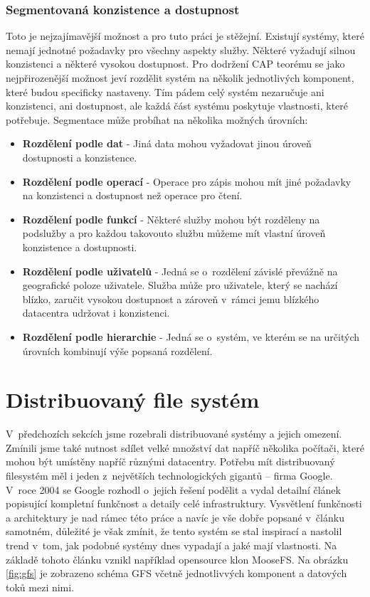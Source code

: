 \subsubsection{Segmentovaná konzistence a dostupnost}
Toto je nejzajímavější možnost a pro tuto práci je stěžejní. Existují systémy, které nemají jednotné požadavky pro všechny aspekty služby. Některé vyžadují silnou konzistenci a některé vysokou dostupnost. Pro dodržení CAP teorému se jako nejpřirozenější možnost jeví rozdělit systém na několik jednotlivých komponent, které budou specificky nastaveny. Tím pádem celý systém nezaručuje ani konzistenci, ani dostupnost, ale každá část systému poskytuje vlastnosti, které potřebuje. Segmentace může probíhat na několika možných úrovních: 

\begin{itemize}
\item \textbf{Rozdělení podle dat} - Jiná data mohou vyžadovat jinou úroveň dostupnosti a konzistence.
\item \textbf{Rozdělení podle operací} - Operace pro zápis mohou mít jiné požadavky na konzistenci a dostupnost než operace pro čtení.
\item \textbf{Rozdělení podle funkcí} - Některé služby mohou být rozděleny na podslužby a pro každou takovouto službu můžeme mít vlastní úroveň konzistence a dostupnosti. 
\item \textbf{Rozdělení podle uživatelů} - Jedná se o~rozdělení závislé převážně na geografické poloze uživatele. Služba může pro uživatele, který se nachází blízko, zaručit vysokou dostupnost a zároveň v~rámci jemu blízkého datacentra udržovat i konzistenci. 
\item \textbf{Rozdělení podle hierarchie} - Jedná se o~systém, ve kterém se na určitých úrovních kombinují výše popsaná rozdělení.
 
\end{itemize}
\section{Distribuovaný file systém}

V~předchozích sekcích jsme rozebrali distribuované systémy a jejich omezení. Zmínili jsme také nutnost sdílet velké množství dat napříč několika počítači, které mohou být umístěny napříč různými datacentry. Potřebu mít distribuovaný filesystém měl i jeden z~největších technologických gigantů – firma Google. V~roce 2004 se Google rozhodl o~jejich řešení podělit a vydal detailní článek \cite{gfs} popisující kompletní funkčnost a detaily celé infrastruktury. Vysvětlení funkčnosti a architektury je nad rámec této práce a navíc je vše dobře popsané v~článku samotném, důležité je však zmínit, že tento systém se stal inspirací a nastolil trend v~tom, jak podobné systémy dnes vypadají a jaké mají vlastnosti. Na základě tohoto článku vznikl například opensource klon MooseFS. Na obrázku \ref{fig:gfs} je zobrazeno schéma GFS včetně jednotlivvých komponent a datových toků mezi nimi. 

